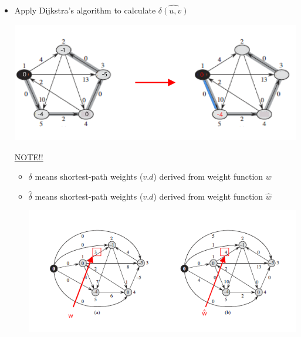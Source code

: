 \documentclass[12pt]{article}
\begin{document}
\begin{enumerate}[1.]
\begin{itemize}
\begin{enumerate}[1.]
            \begin{itemize}
                \item Apply Dijkstra's algorithm to calculate $\hat{\delta(u,v)}$

                \begin{center}
                \includegraphics[width=\linewidth]{images/worksheet_4_solution_60.png}
                \end{center}

                \bigskip

                \underline{NOTE!!}

                \bigskip

                \begin{itemize}
                    \item $\delta$ means shortest-path weights ($v.d$) derived from weight function $w$
                    \item $\hat{\delta}$ means shortest-path weights ($v.d$) derived from weight function $\hat{w}$

                    \begin{center}
                    \includegraphics[width=\linewidth]{images/worksheet_4_solution_59.png}
                    \end{center}
                \end{itemize}


\end{itemize}
\end{enumerate}
\end{itemize}
\end{enumerate}
\end{document}
